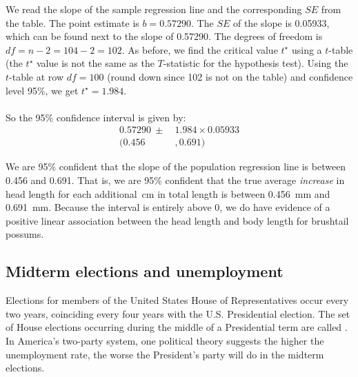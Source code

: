 \begin{examplewrap}
\begin{nexample}
\begin{description}
We read the slope of the sample regression line and the corresponding $SE$ from the table.  The point estimate is $b = 0.57290$.  The $SE$ of the slope is 0.05933, which can be found next to the slope of 0.57290.  The degrees of freedom is $df=n-2=104-2=102$.  As before, we find the critical value $t^{\star}$ using a $t$-table (the $t^{\star}$ value is not the same as the $T$-statistic for the hypothesis test).   Using the $t$-table at row $df = 100$ (round down since 102 is not on the table) and confidence level 95\%, we get $t^{\star}=1.984$.  
\\
\\
So the 95\% confidence interval is given by:
\begin{align*}
0.57290 \ \pm\  &1.984\times  0.05933\\
 (0.456&, 0.691)
\end{align*}
\item[\inferencestep{Conclude}]  We are 95\% confident that the slope of the population regression line is between 0.456 and 0.691.  That is, we are 95\% confident that the true average \emph{increase} in head length for each additional~cm in total length is between 0.456~mm and 0.691~mm.  Because the interval is entirely above 0, we do have evidence of a positive linear association between the head length and body length for brushtail possums.  
\end{description}


\end{nexample}
\end{examplewrap}



\D{\newpage}



\subsection{Midterm elections and unemployment}


Elections for members of the United States House of Representatives occur every two years, coinciding every four years with the U.S. Presidential election. The set of House elections occurring during the middle of a Presidential term are called . In America's two-party system, one political theory suggests the higher the unemployment rate, the worse the President's party will do in the midterm elections.

